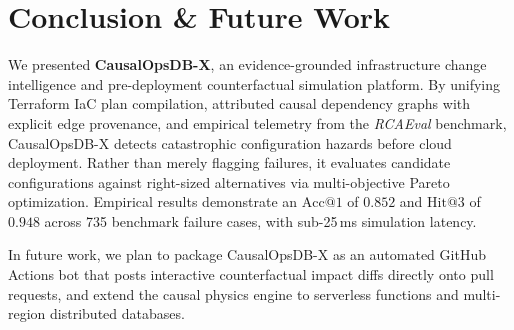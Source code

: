 \documentclass[conference]{IEEEtran}
\begin{document}
\section{Conclusion \& Future Work}
We presented \textbf{CausalOpsDB-X}, an evidence-grounded infrastructure change intelligence and pre-deployment counterfactual simulation platform. By unifying Terraform IaC plan compilation, attributed causal dependency graphs with explicit edge provenance, and empirical telemetry from the \textit{RCAEval} benchmark, CausalOpsDB-X detects catastrophic configuration hazards before cloud deployment. Rather than merely flagging failures, it evaluates candidate configurations against right-sized alternatives via multi-objective Pareto optimization. Empirical results demonstrate an $\text{Acc}@1$ of $0.852$ and $\text{Hit}@3$ of $0.948$ across 735 benchmark failure cases, with sub-25\,ms simulation latency.

In future work, we plan to package CausalOpsDB-X as an automated GitHub Actions bot that posts interactive counterfactual impact diffs directly onto pull requests, and extend the causal physics engine to serverless functions and multi-region distributed databases.

\balance


\end{document}
